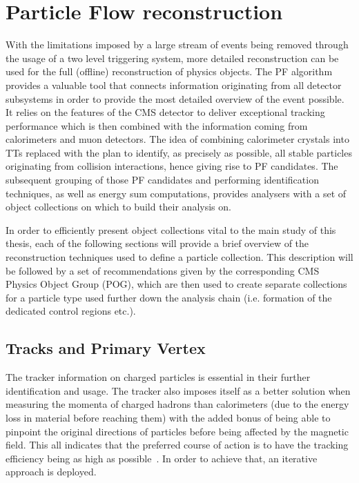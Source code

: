 \section{Particle Flow reconstruction}
\label{sec:particle_flow}
\hspace{10pt} With the limitations imposed by a large stream of events being removed through the usage of a two level triggering system, more detailed reconstruction can be used for the full (offline) reconstruction of physics objects. The PF algorithm~\cite{Particle_flow,CMS-PAS-PFT-09-001,PF:Florian} provides a valuable tool that connects information originating from all detector subsystems in order to provide the most detailed overview of the event possible. It relies on the features of the CMS detector to deliver exceptional tracking performance which is then combined with the information coming from calorimeters and muon detectors. The idea of combining calorimeter crystals into TTs replaced with the plan to identify, as precisely as possible, all stable particles originating from collision interactions, hence giving rise to PF candidates. The subsequent grouping of those PF candidates and performing identification techniques, as well as energy sum computations, provides analysers with a set of object collections on which to build their analysis on.


\hspace{10pt} In order to efficiently present object collections vital to the main study of this thesis, each of the following sections will provide a brief overview of the reconstruction techniques used to define a particle collection. This description will be followed by a set of recommendations given by the corresponding CMS Physics Object Group (POG), which are then used to create separate collections for a particle type used further down the analysis chain (i.e. formation of the dedicated control regions etc.).


\subsection{Tracks and Primary Vertex}
\label{sec:tracking}
\hspace{10pt} The tracker information on charged particles is essential in their further identification and usage. The tracker also imposes itself as a better solution when measuring the momenta of charged hadrons than calorimeters (due to the energy loss in material before reaching them) with the added bonus of being able to pinpoint the original directions of particles before being affected by the magnetic field. This all indicates that the preferred course of action is to have the tracking efficiency being as high as possible~\cite{PF:track}. In order to achieve that, an iterative approach is deployed.

